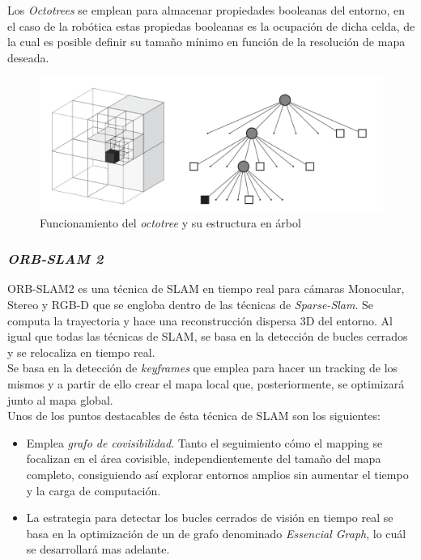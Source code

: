Los \textit{Octotrees} se emplean para almacenar propiedades booleanas del entorno, en el caso de
la robótica estas propiedas booleanas es la ocupación de dicha celda, de la cual es posible definir su tamaño mínimo en función de la resolución de mapa
deseada.
\begin{figure}[h!]
    \centering
    \includegraphics[width=.7\textwidth]{images/octotree}
    \caption{Funcionamiento del \textit{octotree} y su estructura en árbol}
\end{figure}

\newpage
\subsubsection{\textit{ORB-SLAM 2}}
ORB-SLAM2 es una técnica de SLAM en tiempo real para cámaras Monocular, Stereo y RGB-D que se engloba dentro de las técnicas de 
\textit{Sparse-Slam}. Se computa la trayectoria y hace una reconstrucción dispersa 3D del entorno. Al igual que todas las técnicas 
de SLAM, se basa en la detección de bucles cerrados y  se relocaliza en tiempo real. \\
Se basa en la detección de \textit{keyframes} que emplea para hacer un tracking de los mismos y a partir de ello crear el 
mapa local que, posteriormente, se optimizará junto al mapa global. \\
Unos de los puntos destacables de ésta técnica de SLAM son los siguientes:
\begin{itemize}
    \item Emplea \textit{grafo de covisibilidad}. Tanto el seguimiento cómo el mapping se focalizan en el área covisible,
    independientemente del tamaño del mapa completo, consiguiendo así explorar entornos amplios sin
    aumentar el tiempo y la carga de computación.

    \item La estrategia para detectar los bucles cerrados de visión en tiempo real se basa en la optimización de
   un de grafo denominado \textit{Essencial Graph}, lo cuál se desarrollará mas adelante.
\end{itemize}

